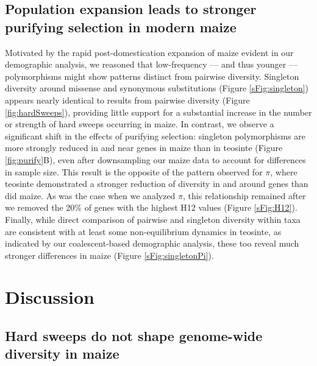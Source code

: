 \documentclass{pnastwo}
\begin{document}
\begin{article}
\subsection{Population expansion leads to stronger purifying selection in modern maize} %
Motivated by the rapid post-domestication expansion of maize evident in our demographic analysis, we reasoned that low-frequency --- and thus younger --- polymorphisms might show patterns distinct from pairwise diversity. 
Singleton diversity around missense and synonymous substitutions (Figure \ref{sFig:singleton}) appears nearly identical to results from pairwise diversity (Figure \ref{fig:hardSweeps}), providing little support for a substantial increase in the number or strength of hard sweeps occurring in maize. 
In contrast, we observe a significant shift in the effects of purifying selection: singleton polymorphisms are more strongly reduced in and near genes in maize than in teosinte (Figure \ref{fig:purify}B), even after downsampling our maize data to account for differences in sample size. This result is the opposite of the pattern observed for $\pi$, where teosinte demonstrated a stronger reduction of diversity in and around genes than did maize. As was the case when we analyzed $\pi$, this relationship remained after we removed the 20\% of genes with the highest H12 values (Figure \ref{sFig:H12}).
Finally, while direct comparison of pairwise and singleton diversity within taxa are consistent with at least some non-equilibrium dynamics in teosinte, as indicated by our coalescent-based demographic analysis, these too reveal much stronger differences in maize (Figure \ref{sFig:singletonPi}). 

\section{Discussion}

\subsection{Hard sweeps do not shape genome-wide diversity in maize} %


\end{article}
\end{document}
